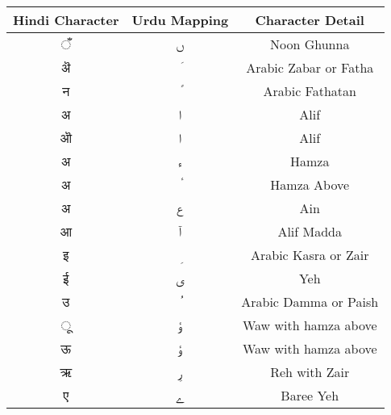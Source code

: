 
\begin{longtable}[c]{|c|c|c|}
\hline
\textbf{Hindi Character} & \textbf{Urdu Mapping} & \textbf{Character Detail} \\ \hline
\endhead
%
\textsanskrit{ँ}               & \texturdu{ں}            & Noon Ghunna                 \\ \hline
\textsanskrit{ऄ}               & \texturdu{َ}            & Arabic Zabar or Fatha       \\ \hline
\textsanskrit{न}               & \texturdu{ً}            & Arabic Fathatan             \\ \hline
\textsanskrit{अ}               & \texturdu{ا}            & Alif                        \\ \hline
\textsanskrit{ऒ}               & \texturdu{ا}            & Alif                        \\ \hline
\textsanskrit{अ}               & \texturdu{ء}            & Hamza                       \\ \hline
\textsanskrit{अ}               & \texturdu{ٔ}            & Hamza Above                 \\ \hline
\textsanskrit{अ}               & \texturdu{ع}            & Ain                         \\ \hline
\textsanskrit{आ}               & \texturdu{آ}            & Alif Madda                  \\ \hline
\textsanskrit{इ}               & \texturdu{ِ}            & Arabic Kasra or Zair        \\ \hline
\textsanskrit{ई}               & \texturdu{ی}            & Yeh                         \\ \hline
\textsanskrit{उ}               & \texturdu{ُ }           & Arabic Damma or Paish       \\ \hline
\textsanskrit{ू}               & \texturdu{ؤ}            & Waw with hamza above        \\ \hline
\textsanskrit{ऊ}               & \texturdu{ؤ}            & Waw with hamza above        \\ \hline
\textsanskrit{ऋ}               & \texturdu{رِ}           & Reh with Zair               \\ \hline
\textsanskrit{ए}               & \texturdu{ے}            & Baree Yeh                   \\ \hline

\end{longtable}
